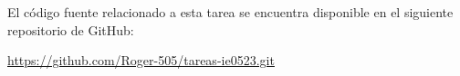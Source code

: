\label{git}
\begin{framed}
El código fuente relacionado a esta tarea se encuentra disponible en el siguiente repositorio de GitHub:

\begin{center}
\url{https://github.com/Roger-505/tareas-ie0523.git}
\end{center}
\end{framed}
